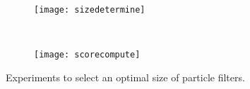\begin{figure}[h]
\centering
  \begin{subfigure}{0.48\textwidth}
  \texttt{[image: sizedetermine]}
  \caption{}
  \label{fig:sizedeter}
  \end{subfigure}
  ~
  \begin{subfigure}{0.48\textwidth}
  \texttt{[image: scorecompute]}
  \caption{}
  \label{fig:scorecompute}
  \end{subfigure}
  \caption{Experiments to select an optimal size of particle filters.}
\end{figure} 


\FloatBarrier